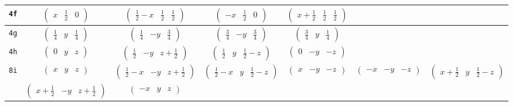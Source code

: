 \documentclass[fleqn,9pt,landscape]{jsarticle}
\begin{document}
\begin{center}
\begin{longtable}{ccccccc}
{\tt 4f} & $ \begin{pmatrix} x & \frac{1}{2} & 0 \end{pmatrix} $ & $ \begin{pmatrix} \frac{1}{2} - x & \frac{1}{2} & \frac{1}{2} \end{pmatrix} $ & $ \begin{pmatrix} - x & \frac{1}{2} & 0 \end{pmatrix} $ & $ \begin{pmatrix} x + \frac{1}{2} & \frac{1}{2} & \frac{1}{2} \end{pmatrix} $ & $  $ & $  $ \\ \hline
{\tt 4g} & $ \begin{pmatrix} \frac{1}{4} & y & \frac{1}{4} \end{pmatrix} $ & $ \begin{pmatrix} \frac{1}{4} & - y & \frac{3}{4} \end{pmatrix} $ & $ \begin{pmatrix} \frac{3}{4} & - y & \frac{3}{4} \end{pmatrix} $ & $ \begin{pmatrix} \frac{3}{4} & y & \frac{1}{4} \end{pmatrix} $ & $  $ & $  $ \\ \hline
{\tt 4h} & $ \begin{pmatrix} 0 & y & z \end{pmatrix} $ & $ \begin{pmatrix} \frac{1}{2} & - y & z + \frac{1}{2} \end{pmatrix} $ & $ \begin{pmatrix} \frac{1}{2} & y & \frac{1}{2} - z \end{pmatrix} $ & $ \begin{pmatrix} 0 & - y & - z \end{pmatrix} $ & $  $ & $  $ \\ \hline
{\tt 8i} & $ \begin{pmatrix} x & y & z \end{pmatrix} $ & $ \begin{pmatrix} \frac{1}{2} - x & - y & z + \frac{1}{2} \end{pmatrix} $ & $ \begin{pmatrix} \frac{1}{2} - x & y & \frac{1}{2} - z \end{pmatrix} $ & $ \begin{pmatrix} x & - y & - z \end{pmatrix} $ & $ \begin{pmatrix} - x & - y & - z \end{pmatrix} $ & $ \begin{pmatrix} x + \frac{1}{2} & y & \frac{1}{2} - z \end{pmatrix} $ \\
& $ \begin{pmatrix} x + \frac{1}{2} & - y & z + \frac{1}{2} \end{pmatrix} $ & $ \begin{pmatrix} - x & y & z \end{pmatrix} $ & $  $ & $  $ & $  $ & $  $ \\
\end{longtable}
\end{center}
\end{document}
